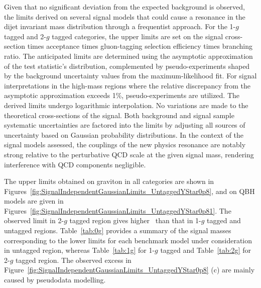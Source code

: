 

Given that no significant deviation from the expected background is observed, the limits derived on several signal models that could cause a resonance in the dijet invariant mass distribution through a frequentist approach. For the 1-$g$ tagged and 2-$g$ tagged categories, the upper limits are set on the signal cross-section times acceptance times gluon-tagging selection efficiency times branching ratio.  The anticipated limits are determined using the asymptotic approximation of the test statistic's distribution, complemented by pseudo-experiments shaped by the background uncertainty values from the maximum-likelihood fit. For signal interpretations in the high-mass regions where the relative discrepancy from the asymptotic approximation exceeds 1\%, pseudo-experiments are utilized. The derived limits undergo logarithmic interpolation. No variations are made to the theoretical cross-sections of the signal. Both background and signal sample systematic uncertainties are factored into the limits by adjusting all sources of uncertainty based on Gaussian probability distributions. In the context of the signal models assessed, the couplings of the new physics resonance are notably strong relative to the perturbative QCD scale at the given signal mass, rendering interference with QCD components negligible.


The upper limits obtained on graviton in all categories are shown in Figures~\ref{fig:SignalIndependentGaussianLimits_UntaggedYStar0p8}, and on QBH models are given in Figures~\ref{fig:SignalIndependentGaussianLimits_UntaggedYStar0p81}. The observed limit in 2-$g$ tagged region gives higher \mjj\ than that in 1-$g$ tagged and untagged regions. Table~\ref{tab:0g} provides a summary of the signal masses corresponding to the lower limits for each benchmark model under consideration in untagged region, whereas Table~\ref{tab:1g} for 1-$g$ tagged and Table~\ref{tab:2g} for  2-$g$ tagged region.  The observed excess in Figure~\ref{fig:SignalIndependentGaussianLimits_UntaggedYStar0p8} (c) are mainly caused by pseudodata modelling. %




